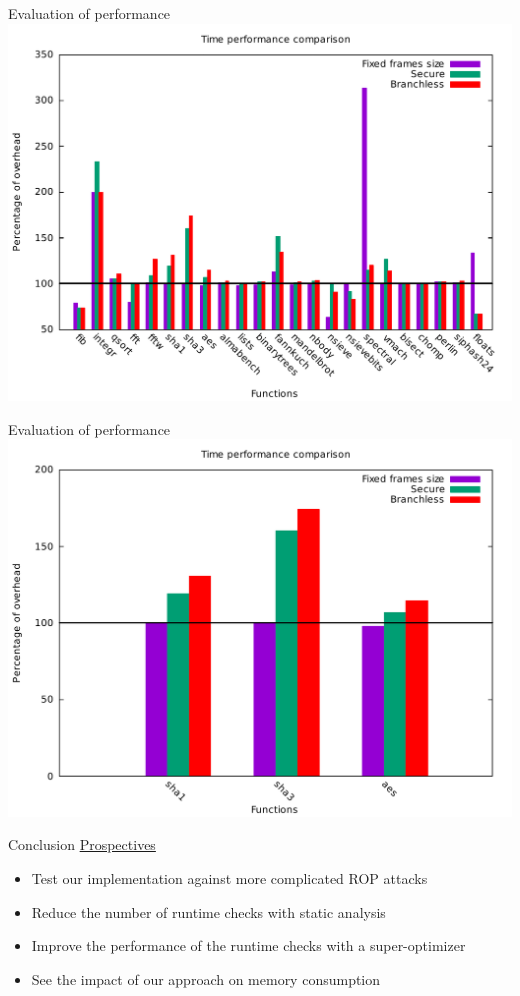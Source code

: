 \documentclass{beamer}
\begin{document}
\begin{frame}[c]{Evaluation of performance }
	\includegraphics[width=\textwidth]{images/time_percentage_graph.pdf}
\end{frame}

\begin{frame}[c]{Evaluation of performance }
	\includegraphics[width=\textwidth]{images/percentage_focus.pdf}
\end{frame}


\begin{frame}[c]{Conclusion}
	\underline{Prospectives}
	\begin{itemize}
		\item Test our implementation against more complicated ROP attacks
		\item Reduce the number of runtime checks with static analysis~\cite{Zeng:2011:CCI:2046707.2046713}
		\item Improve the performance of the runtime checks with a super-optimizer
		\item See the impact of our approach on memory consumption
	\end{itemize}
\end{frame}
\end{document}
